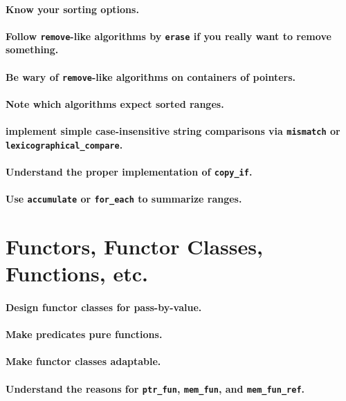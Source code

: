 \documentclass{article}
\begin{document}
\paragraph{Know your sorting options.}
\paragraph{Follow {\tt remove}-like algorithms by {\tt erase} if you really want to remove something.}
\paragraph{Be wary of {\tt remove}-like algorithms on containers of pointers.}
\paragraph{Note which algorithms expect sorted ranges.}
\paragraph{implement simple case-insensitive string comparisons via {\tt mismatch} or {\tt lexicographical\_compare}.}
\paragraph{Understand the proper implementation of {\tt copy\_if}.}
\paragraph{Use {\tt accumulate} or {\tt for\_each} to summarize ranges.}

\section{Functors, Functor Classes, Functions, etc.}

\paragraph{Design functor classes for pass-by-value.}
\paragraph{Make predicates pure functions.}
\paragraph{Make functor classes adaptable.}
\paragraph{Understand the reasons for {\tt ptr\_fun}, {\tt mem\_fun}, and {\tt mem\_fun\_ref}.}
\end{document}
